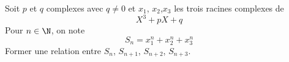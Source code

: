 Soit $p$ et $q$ complexes avec $q\neq 0$ et $x_1$, $x_2$,$x_3$ les trois racines complexes de 
\begin{displaymath}
 X^3+pX+q
\end{displaymath}
Pour $n\in\N$, on note
\begin{displaymath}
 S_n = x_1^n+x_2^n+x_3^n
\end{displaymath}
Former une relation entre $S_n$, $S_{n+1}$, $S_{n+2}$, $S_{n+3}$.

\bigskip